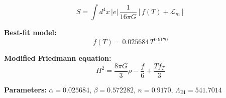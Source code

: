 
\begin{equation}
  S = \int d^4x \, |e| \, \frac{1}{16\pi G} \left[ f(T) + \mathcal{L}_m \right]
\end{equation}

\textbf{Best-fit model:}
\begin{equation}
  f(T) = 0.025684 \, T^{0.9170}
\end{equation}

\textbf{Modified Friedmann equation:}
\begin{equation}
  H^2 = \frac{8\pi G}{3} \rho - \frac{f}{6} + \frac{T f_T}{3}
\end{equation}

\textbf{Parameters:}
$\alpha = 0.025684$, \quad
$\beta = 0.572282$, \quad
$n = 0.9170$, \quad
$\Lambda_{\text{BI}} = 541.7014$